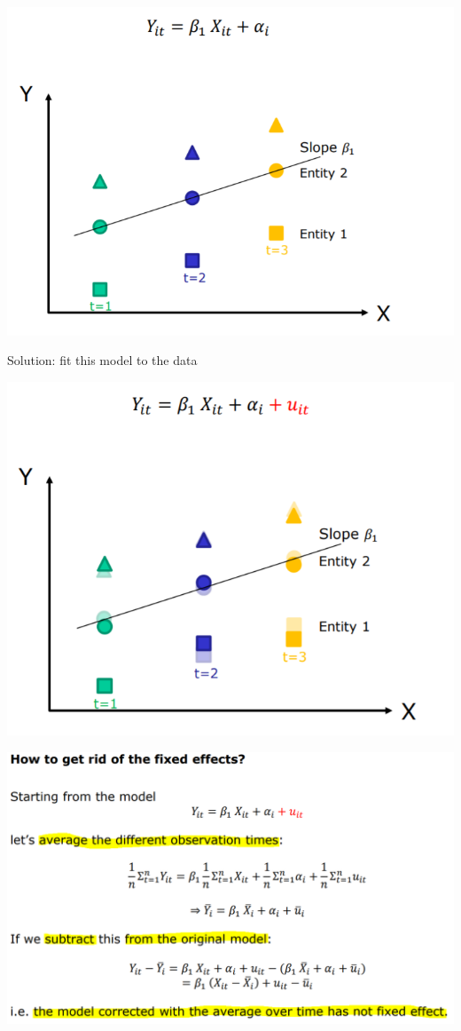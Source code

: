 \documentclass[
]{article}
\begin{document}
\includegraphics[width=1\linewidth]{dep}

Solution: fit this model to the data

\includegraphics[width=1\linewidth]{dep1}

\includegraphics[width=1\linewidth]{fixed}
\end{document}
